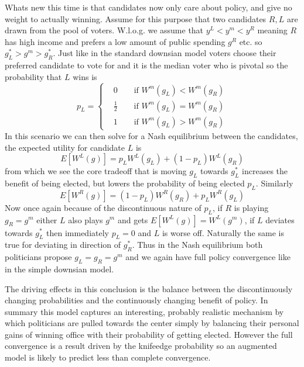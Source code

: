 Whats new this time is that candidates now only care about policy, and give no weight to actually winning. Assume for this purpose that two candidates $R,L$ are drawn from the pool of voters. W.l.o.g. we assume that $y^L < y^m < y^R$ meaning $R$ has high income and prefers a low amount of public spending $g^R$ etc. so $g^*_L > g^m > g^*_R$. Just like in the standard downsian model voters choose their preferred candidate to vote for and it is the median voter who is pivotal so the probability that $L$ wins is
\begin{equation}
    p_L = \begin{cases}
    &    0 \qquad \text{if } W^m(g_L) < W^m(g_R) \\ 
    &    \frac{1}{2} \qquad \text{if } W^m(g_L) = W^m(g_R) \\ 
    &    1 \qquad \text{if } W^m(g_L) > W^m(g_R)
    \end{cases}
\end{equation}
In this scenario we can then solve for a Nash equilibrium between the candidates, the expected utility for candidate $L$ is 
\begin{equation}
    E[W^L(g)] = p_L W^L(g_L) + (1-p_L)W^L(g_R)
\end{equation}
from which we see the core tradeoff that is moving $g_L$ towards $g_L^*$ increases the benefit of being elected, but lowers the probability of being elected $p_L$. Similarly 
\begin{equation}
    E[W^R(g)] = (1-p_L) W^R(g_R) + p_L W^R(g_L)
\end{equation}
Now once again because of the discontinuous nature of $p_L$, if $R$ is playing $g_R=g^m$ either $L$ also plays $g^m$ and gets $E[W^L(g)]=W^L(g^m)$, if $L$ deviates towards $g_L^*$ then immediately $p_L=0$ and $L$ is worse off. Naturally the same is true for deviating in direction of $g_R^*$. Thus in the Nash equilibrium both politicians propose $g_L=g_R=g^m$ and we again have full policy convergence like in the simple downsian model.

The driving effects in this conclusion is the balance between the discontinuously changing probabilities and the continuously changing benefit of policy. In summary this model captures an interesting, probably realistic mechanism by which politicians are pulled towards the center simply by balancing their personal gains of winning office with their probability of getting elected. However the full convergence is a result driven by the knifeedge probability so an augmented model is likely to predict less than complete convergence. 

